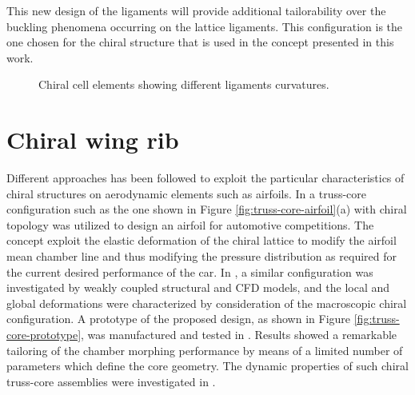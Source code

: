   This new design of the ligaments will provide additional tailorability over the buckling phenomena occurring on the lattice ligaments. This configuration is the one chosen for the chiral structure that is used in the concept presented in this work.

  \begin{figure}[!htpb]
    \centering
     \qquad
    \caption[Chiral cell elements showing different ligaments curvatures]{Chiral cell elements showing different ligaments curvatures. \cite{Ramstein2016}}
    \label{fig:ramstein}
  \end{figure}

\clearpage
\section{Chiral wing rib} \label{sec:wingRibChiral_state}

  Different approaches has been followed to exploit the particular characteristics of chiral structures on aerodynamic elements such as airfoils. In \cite{Bornengo2005} a truss-core configuration such as the one shown in Figure \ref{fig:truss-core-airfoil}(a) with chiral topology was utilized to design an airfoil for automotive competitions. The concept exploit the elastic deformation of the chiral lattice to modify the airfoil mean chamber line and thus modifying the pressure distribution as required for the current desired performance of the car. In \cite{Spadoni2007a}, a similar configuration was investigated by weakly coupled structural and CFD models, and the local and global deformations were characterized by consideration of the macroscopic chiral configuration. A prototype of the proposed design, as shown in Figure \ref{fig:truss-core-prototype}, was manufactured and tested in \cite{Spadoni2007b}. Results showed a remarkable tailoring of the chamber morphing performance by means of a limited number of parameters which define the core geometry. The dynamic properties of such chiral truss-core assemblies were investigated in \cite{Spadoni2006}.

